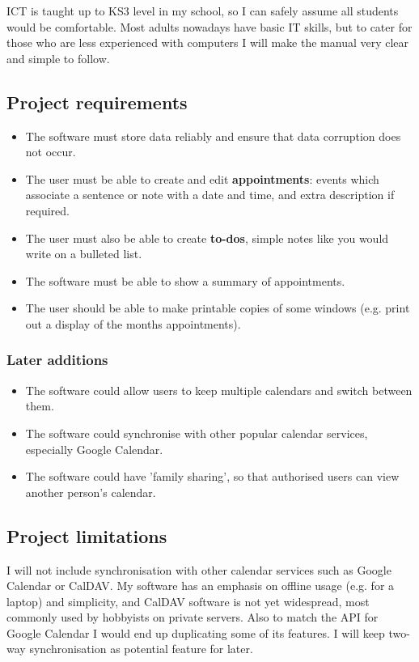 ICT is taught up to KS3 level in my school, so I can safely assume all students
would be comfortable. Most adults nowadays have basic IT skills, but to cater
for those who are less experienced with computers I will make the manual very
clear and simple to follow.


\subsection{Project requirements}

\begin{itemize}
    \item The software must store data reliably and ensure that data corruption
        does not occur.
    \item The user must be able to create and edit \textbf{appointments}: events
        which associate a sentence or note with a date and time, and extra
        description if required.
    \item The user must also be able to create \textbf{to-dos}, simple notes
        like you would write on a bulleted list.
    \item The software must be able to show a summary of appointments.
    \item The user should be able to make printable copies of some windows (e.g.
        print out a display of the months appointments).
\end{itemize}

\subsubsection{Later additions}
\begin{itemize}
  \item The software could allow users to keep multiple calendars and switch
        between them.
  \item The software could synchronise with other popular calendar services,
        especially Google Calendar.
  \item The software could have 'family sharing', so that authorised users can
        view another person's calendar.
\end{itemize}

\subsection{Project limitations}

I will not include synchronisation with other calendar services such as Google
Calendar or CalDAV. My software has an emphasis on offline usage (e.g. for a
laptop) and simplicity, and CalDAV software is not yet widespread, most commonly
used by hobbyists on private servers. Also to match the API for Google Calendar
I would end up duplicating some of its features. I will keep two-way
synchronisation as potential feature for later.


